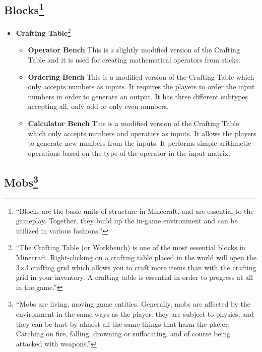 \subsection[Blocks]{Blocks\footnote{``Blocks are the basic units of structure in Minecraft, and are essential to the gameplay. Together, they build up the in-game environment and can be utilized in various fashions.''\cite{website:minecraft-blocks}}}

\begin{itemize}
\large \item \textbf{Crafting Table}\footnote{``The Crafting Table (or Workbench) is one of the most essential blocks in Minecraft. Right-clicking on a crafting table placed in the world will open the 3×3 crafting grid which allows you to craft more items than with the crafting grid in your inventory. A crafting table is essential in order to progress at all in the game.''\cite{website:minecraft-table}}

\normalsize
\begin{itemize}
\item \textbf{Operator Bench}
\newline
\normalsize This is a slightly modified version of the Crafting Table and it is used for creating mathematical operators from sticks.	

\item \textbf{Ordering Bench}
\newline
\normalsize This is a modified version of the Crafting Table which only accepts numbers as inputs. It requires the players to order the input numbers in order to generate an output. It has three different subtypes accepting all, only odd or only even numbers.

\item \textbf{Calculator Bench}
\newline
\normalsize This is a modified version of the Crafting Table which only accepts numbers and operators as inputs. It allows the players to generate new numbers from the inputs. It performs simple arithmetic operations based on the type of the operator in the input matrix.
\end{itemize}
\end{itemize}

\subsection[Mobs]{Mobs\footnote{``Mobs are living, moving game entities. Generally, mobs are affected by the environment in the same ways as the player: they are subject to physics, and they can be hurt by almost all the same things that harm the player: Catching on fire, falling, drowning or suffocating, and of course being attacked with weapons.''\cite{website:minecraft-mobs}}}

